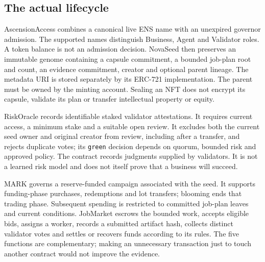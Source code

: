 \documentclass[11pt]{article}
\begin{document}
\subsection{The actual lifecycle}

AscensionAccess combines a canonical live ENS name with an unexpired governor admission. The supported names distinguish Business, Agent and Validator roles. A token balance is not an admission decision. NovaSeed then preserves an immutable genome containing a capsule commitment, a bounded job-plan root and count, an evidence commitment, creator and optional parent lineage. The metadata URI is stored separately by its ERC-721 implementation. The parent must be owned by the minting account. Sealing an NFT does not encrypt its capsule, validate its plan or transfer intellectual property or equity.

RiskOracle records identifiable staked validator attestations. It requires current access, a minimum stake and a suitable open review. It excludes both the current seed owner and original creator from review, including after a transfer, and rejects duplicate votes; its \texttt{green} decision depends on quorum, bounded risk and approved policy. The contract records judgments supplied by validators. It is not a learned risk model and does not itself prove that a business will succeed.

MARK governs a reserve-funded campaign associated with the seed. It supports funding-phase purchases, redemptions and lot transfers; blooming ends that trading phase. Subsequent spending is restricted to committed job-plan leaves and current conditions. JobMarket escrows the bounded work, accepts eligible bids, assigns a worker, records a submitted artifact hash, collects distinct validator votes and settles or recovers funds according to its rules. The five functions are complementary; making an unnecessary transaction just to touch another contract would not improve the evidence.
\end{document}
